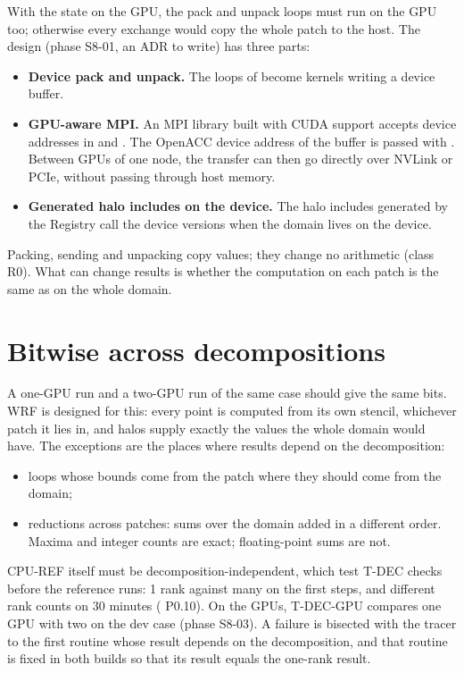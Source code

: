 With the state on the GPU, the pack and unpack loops must run on the GPU too; otherwise every exchange would copy the
whole patch to the host. The design (phase S8-01, an ADR to write) has three parts:
\begin{itemize}
  \item \textbf{Device pack and unpack.} The loops of  become kernels writing a device buffer.
  \item \textbf{GPU-aware MPI.} An MPI library built with CUDA support accepts device addresses in 
    and . The OpenACC device address of the buffer is passed with . Between
    GPUs of one node, the transfer can then go directly over NVLink or PCIe, without passing through host memory.
  \item \textbf{Generated halo includes on the device.} The halo includes generated by the Registry call the device
    versions when the domain lives on the device.
\end{itemize}
Packing, sending and unpacking copy values; they change no arithmetic (class R0). What can change results is whether
the computation on each patch is the same as on the whole domain.

\section{Bitwise across decompositions}

A one-GPU run and a two-GPU run of the same case should give the same bits. WRF is designed for this: every point is
computed from its own stencil, whichever patch it lies in, and halos supply exactly the values the whole domain would
have. The exceptions are the places where results depend on the decomposition:
\begin{itemize}
  \item loops whose bounds come from the patch where they should come from the domain;
  \item reductions across patches: sums over the domain added in a different order. Maxima and integer counts are
    exact; floating-point sums are not.
\end{itemize}
CPU-REF itself must be decomposition-independent, which test T-DEC checks before the reference runs: 1 rank against
many on the first steps, and different rank counts on 30 minutes ( P0.10). On the GPUs, T-DEC-GPU
compares one GPU with two on the dev case (phase S8-03). A failure is bisected with the tracer to the first routine
whose result depends on the decomposition, and that routine is fixed in both builds so that its result equals the
one-rank result.

